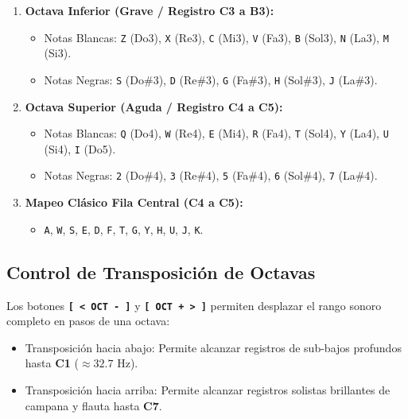 \documentclass[11pt,a4paper]{article}
\begin{document}
\begin{enumerate}[leftmargin=1.5cm]
    \item \textbf{Octava Inferior (Grave / Registro C3 a B3):}
    \begin{itemize}
        \item Notas Blancas: \texttt{Z} (Do3), \texttt{X} (Re3), \texttt{C} (Mi3), \texttt{V} (Fa3), \texttt{B} (Sol3), \texttt{N} (La3), \texttt{M} (Si3).
        \item Notas Negras: \texttt{S} (Do\#3), \texttt{D} (Re\#3), \texttt{G} (Fa\#3), \texttt{H} (Sol\#3), \texttt{J} (La\#3).
    \end{itemize}
    \item \textbf{Octava Superior (Aguda / Registro C4 a C5):}
    \begin{itemize}
        \item Notas Blancas: \texttt{Q} (Do4), \texttt{W} (Re4), \texttt{E} (Mi4), \texttt{R} (Fa4), \texttt{T} (Sol4), \texttt{Y} (La4), \texttt{U} (Si4), \texttt{I} (Do5).
        \item Notas Negras: \texttt{2} (Do\#4), \texttt{3} (Re\#4), \texttt{5} (Fa\#4), \texttt{6} (Sol\#4), \texttt{7} (La\#4).
    \end{itemize}
    \item \textbf{Mapeo Clásico Fila Central (C4 a C5):}
    \begin{itemize}
        \item \texttt{A}, \texttt{W}, \texttt{S}, \texttt{E}, \texttt{D}, \texttt{F}, \texttt{T}, \texttt{G}, \texttt{Y}, \texttt{H}, \texttt{U}, \texttt{J}, \texttt{K}.
    \end{itemize}
\end{enumerate}

\subsection{Control de Transposición de Octavas}
Los botones \textbf{\texttt{[ < OCT - ]}} y \textbf{\texttt{[ OCT + > ]}} permiten desplazar el rango sonoro completo en pasos de una octava:
\begin{itemize}[leftmargin=1.5cm]
    \item Transposición hacia abajo: Permite alcanzar registros de sub-bajos profundos hasta \textbf{C1} ($\approx 32.7\text{ Hz}$).
    \item Transposición hacia arriba: Permite alcanzar registros solistas brillantes de campana y flauta hasta \textbf{C7}.
\end{itemize}
\end{document}

